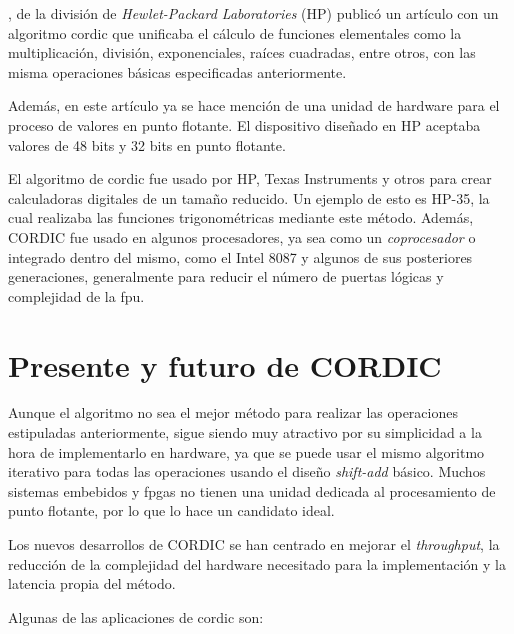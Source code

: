 \cite{walther_unified_1971}, de la división de \textit{Hewlet-Packard Laboratories} (HP) publicó un artículo con un algoritmo \gls{cordic} que unificaba el cálculo de funciones elementales como la multiplicación, división, exponenciales, raíces cuadradas, entre otros, con las misma operaciones básicas especificadas anteriormente.

Además, en este artículo ya se hace mención de una unidad de hardware para el proceso de valores en punto flotante. El dispositivo diseñado en HP aceptaba valores de 48 bits y 32 bits en punto flotante.

El algoritmo de \gls{cordic} fue usado por HP, Texas Instruments y otros para crear calculadoras digitales de un tamaño reducido. Un ejemplo de esto es HP-35, la cual realizaba las funciones trigonométricas mediante este método. Además, CORDIC fue usado en algunos procesadores, ya sea como un \textit{coprocesador} o integrado dentro del mismo, como el Intel 8087 y algunos de sus posteriores generaciones, generalmente para reducir el número de puertas lógicas y complejidad de la \gls{fpu}.


\section{Presente y futuro de CORDIC}
Aunque el algoritmo no sea el mejor método para realizar las operaciones estipuladas anteriormente, sigue siendo muy atractivo por su simplicidad a la hora de implementarlo en hardware, ya que se puede usar el mismo algoritmo iterativo para todas las operaciones usando el diseño \textit{shift-add} básico. Muchos sistemas embebidos y \gls{fpga}s no tienen una unidad dedicada al procesamiento de punto flotante, por lo que lo hace un candidato ideal.

Los nuevos desarrollos de CORDIC se han centrado en mejorar el \textit{throughput}, la reducción de la complejidad del hardware necesitado para la implementación y la latencia propia del método.

Algunas de las aplicaciones de \gls{cordic} son:

